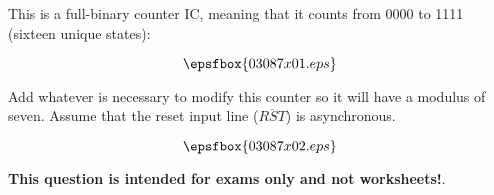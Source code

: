 

This is a full-binary counter IC, meaning that it counts from 0000 to 1111 (sixteen unique states):

$$\epsfbox{03087x01.eps}$$

\vskip 50pt

Add whatever is necessary to modify this counter so it will have a modulus of seven.  Assume that the reset input line ($\overline{RST}$) is asynchronous.







$$\epsfbox{03087x02.eps}$$







{\bf This question is intended for exams only and not worksheets!}.




